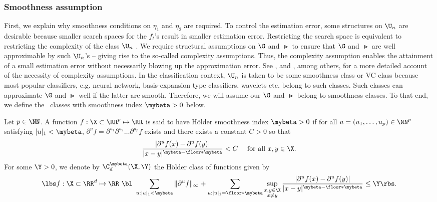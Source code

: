 \documentclass[preprint] {imsart}
\def\purple{\color{purple}}
\def\red{\color{red}}
\newcommand{\tcomm}[1]{\fbox{\bf\scriptsize\purple #1}}
\begin{document}
\subsubsection{Smoothness assumption}
First, we explain why smoothness conditions on $\eta_1$ and $\eta_2$ are required.  To control the  estimation error, 
 some structures on $\U_n$ are desirable because  smaller search spaces for the $f_t$'s result in smaller estimation error. Restricting the search space is equivalent to restricting the complexity of the class $\U_n$ \citep{audibert2007}. We require structural assumptions on $\G$ and $\Gt$ to ensure that $\G$ and $\Gt$ are well approximable by such  $\U_n$'s  -- giving rise to the so-called complexity assumptions. Thus, the complexity assumption enables the attainment of a small estimation error without necessarily blowing up the approximation error. 
See \cite{audibert2007}, \cite{koltchinskii2009} and \cite{tsybakov2004}, among others, for a more detailed account of the necessity of complexity assumptions. In the classification context,  $\U_n$ is taken to be some smoothness class or VC class  because most popular classifiers, e.g. neural network, basis-expansion type classifiers,  wavelets  etc. belong to such classes. Such classes can approximate $\G$ and $\Gt$ well if the latter are smooth. 
 Therefore, we will assume  our $\G$ and $\Gt$ belong to smoothness classes. To that end, we define the \Holder\  classes
 with smoothness index $\mybeta>0$ below.

Let $p\in\NN$. A  function $f:\mathcal \X\subset\RR^p\mapsto \RR$ is said to have H{\"o}lder smoothness index $\mybeta>0$ if for all $u=(u_1,\ldots,u_p)\in \NN^p$ satisfying $|u|_1<\mybeta$, $\partial^u f=\partial^{u_1}\partial^{u_2}\ldots\partial^{u_p} f$ exists and there exists a constant $C>0$ so that
\[\frac{|\partial^u f(x)-\partial^u f(y)|}{|x-y|^{\mybeta-\floor*{\mybeta}}}<C\quad \text{ for all }x,y\in \X.\]
For some $\Y>0$, we denote by $\C^\mybeta_d(\X,\Y)$ the H{\"o}lder  class of functions given by{\small
\begin{align}\label{def: holder}
\lbs f: \X\subset \RR^d\mapsto\RR\ \bl\  \sum_{u:|u|_1<\mybeta}\|\partial^u f\|_\infty+\sum_{u:|u|_1=\floor*{\mybeta}}\sup_{\substack{x,y\in \mathcal \X\\ 
x\neq y}}\frac{|\partial^u f(x)-\partial^u f(y)|}{|x-y|^{\mybeta-\floor*{\mybeta}}}\leq \Y\rbs.
\end{align}}
\end{document}
